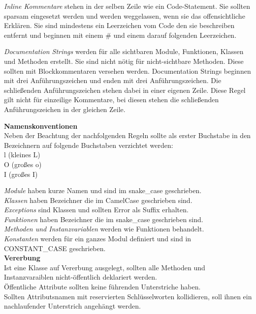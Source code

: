 \textit{Inline Kommentare} stehen in der selben Zeile wie ein Code-Statement. Sie sollten sparsam eingesetzt werden und werden weggelassen, wenn sie das offensichtliche Erklären. Sie sind mindestens ein Leerzeichen vom Code den sie beschreiben entfernt und beginnen mit einem \# und einem darauf folgenden Leerzeichen. 

\textit{Documentation Strings} werden für alle sichtbaren Module, Funktionen, Klassen und Methoden erstellt. Sie sind nicht nötig für nicht-sichtbare Methoden. Diese sollten mit Blockkommentaren versehen werden. Documentation Strings beginnen mit drei Anführungszeichen und enden mit drei Anführungszeichen. Die schließenden Anführungszeichen stehen dabei in einer eigenen Zeile. Diese Regel gilt nicht für einzeilige Kommentare, bei diesen stehen die schließenden Anführungszeichen in der gleichen Zeile.
\begin{tabbing}
\textbf{Namenskonventionen}\\
Neben \= der Beachtung der nachfolgenden Regeln sollte als erster Buchstabe in den \\
Bezeichnern auf folgende Buchstaben verzichtet werden:\\
\> l (kleines L) \\
\> O (großes o)\\
\> I (großes I)
\end{tabbing}
\textit{Module} haben kurze Namen und sind im snake\_case geschrieben. \\
\textit{Klassen} haben Bezeichner die im CamelCase geschrieben sind.\\
\textit{Exceptions} sind Klassen und sollten \glqq Error\grqq\: als Suffix erhalten.\\
\textit {Funktionen} haben Bezeichner die im snake\_case geschrieben sind.\\
\textit{Methoden und Instanzvariablen} werden wie Funktionen behandelt.\\
\textit{Konstanten} werden für ein ganzes Modul definiert und sind in CONSTANT\_CASE geschrieben.\\

\textbf{Vererbung}\\
Ist eine Klasse auf Vererbung ausgelegt, sollten alle Methoden und Instanzvaraiblen nicht-öffentlich deklariert werden.\\
Öffentliche Attribute sollten keine führenden Unterstriche haben.\\
Sollten Attributsnamen mit reservierten Schlüsselworten kollidieren, soll ihnen ein nachlaufender Unterstrich angehängt werden.\\

